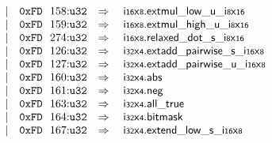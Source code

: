 $$\begin{array}[t]{@{}lrrl@{}l@{}l@{}l@{}}
& & | & \mathtt{0xFD}~~158{:}{\mathtt{u32}} & \quad\Rightarrow\quad{} & {\mathsf{i{\scriptstyle 16}}}{\mathsf{x}}{\mathsf{{\scriptstyle 8}}} {.} {{\mathsf{extmul}}{\mathsf{\_}}{\mathsf{low}}{\mathsf{\_}}{\mathsf{u}}}{\mathsf{\_}}{{\mathsf{i{\scriptstyle 8}}}{\mathsf{x}}{\mathsf{{\scriptstyle 16}}}} \\
& & | & \mathtt{0xFD}~~159{:}{\mathtt{u32}} & \quad\Rightarrow\quad{} & {\mathsf{i{\scriptstyle 16}}}{\mathsf{x}}{\mathsf{{\scriptstyle 8}}} {.} {{\mathsf{extmul}}{\mathsf{\_}}{\mathsf{high}}{\mathsf{\_}}{\mathsf{u}}}{\mathsf{\_}}{{\mathsf{i{\scriptstyle 8}}}{\mathsf{x}}{\mathsf{{\scriptstyle 16}}}} \\
& & | & \mathtt{0xFD}~~274{:}{\mathtt{u32}} & \quad\Rightarrow\quad{} & {\mathsf{i{\scriptstyle 16}}}{\mathsf{x}}{\mathsf{{\scriptstyle 8}}} {.} {{\mathsf{relaxed\_dot}}{\mathsf{\_}}{\mathsf{s}}}{\mathsf{\_}}{{\mathsf{i{\scriptstyle 8}}}{\mathsf{x}}{\mathsf{{\scriptstyle 16}}}} \\
& & | & \mathtt{0xFD}~~126{:}{\mathtt{u32}} & \quad\Rightarrow\quad{} & {\mathsf{i{\scriptstyle 32}}}{\mathsf{x}}{\mathsf{{\scriptstyle 4}}} {.} {{\mathsf{extadd\_pairwise}}{\mathsf{\_}}{\mathsf{s}}}{\mathsf{\_}}{{\mathsf{i{\scriptstyle 16}}}{\mathsf{x}}{\mathsf{{\scriptstyle 8}}}} \\
& & | & \mathtt{0xFD}~~127{:}{\mathtt{u32}} & \quad\Rightarrow\quad{} & {\mathsf{i{\scriptstyle 32}}}{\mathsf{x}}{\mathsf{{\scriptstyle 4}}} {.} {{\mathsf{extadd\_pairwise}}{\mathsf{\_}}{\mathsf{u}}}{\mathsf{\_}}{{\mathsf{i{\scriptstyle 16}}}{\mathsf{x}}{\mathsf{{\scriptstyle 8}}}} \\
& & | & \mathtt{0xFD}~~160{:}{\mathtt{u32}} & \quad\Rightarrow\quad{} & {\mathsf{i{\scriptstyle 32}}}{\mathsf{x}}{\mathsf{{\scriptstyle 4}}} {.} \mathsf{abs} \\
& & | & \mathtt{0xFD}~~161{:}{\mathtt{u32}} & \quad\Rightarrow\quad{} & {\mathsf{i{\scriptstyle 32}}}{\mathsf{x}}{\mathsf{{\scriptstyle 4}}} {.} \mathsf{neg} \\
& & | & \mathtt{0xFD}~~163{:}{\mathtt{u32}} & \quad\Rightarrow\quad{} & {\mathsf{i{\scriptstyle 32}}}{\mathsf{x}}{\mathsf{{\scriptstyle 4}}} {.} \mathsf{all\_true} \\
& & | & \mathtt{0xFD}~~164{:}{\mathtt{u32}} & \quad\Rightarrow\quad{} & {\mathsf{i{\scriptstyle 32}}}{\mathsf{x}}{\mathsf{{\scriptstyle 4}}}{.}\mathsf{bitmask} \\
& & | & \mathtt{0xFD}~~167{:}{\mathtt{u32}} & \quad\Rightarrow\quad{} & {\mathsf{i{\scriptstyle 32}}}{\mathsf{x}}{\mathsf{{\scriptstyle 4}}} {.} {{\mathsf{extend}}{\mathsf{\_}}{\mathsf{low}}{\mathsf{\_}}{\mathsf{s}}}{\mathsf{\_}}{{\mathsf{i{\scriptstyle 16}}}{\mathsf{x}}{\mathsf{{\scriptstyle 8}}}} \\

\end{array}$$
